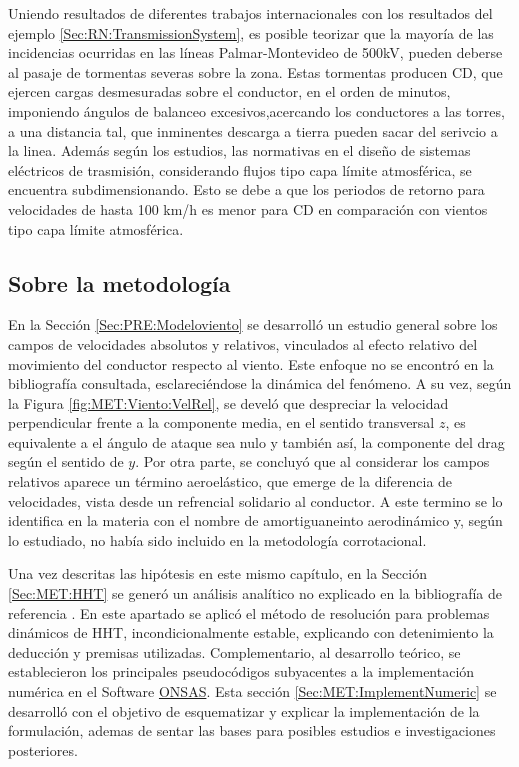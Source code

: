 Uniendo resultados de diferentes trabajos internacionales con los resultados del  ejemplo \ref{Sec:RN:TransmissionSystem}, es posible teorizar que la mayoría de las incidencias ocurridas en las líneas Palmar-Montevideo de 500kV, pueden deberse al pasaje de tormentas severas sobre la zona. Estas tormentas producen CD, que ejercen cargas desmesuradas sobre el conductor, en el orden de minutos, imponiendo ángulos de balanceo excesivos,acercando los conductores a las torres, a una distancia tal, que inminentes descarga a tierra pueden sacar del serivcio a la linea. Además según los estudios, las normativas en el diseño de sistemas eléctricos de trasmisión, considerando flujos tipo capa límite atmosférica, se encuentra subdimensionando. Esto se debe a que los periodos de retorno para velocidades de hasta 100 km/h es menor para CD en comparación con vientos tipo capa límite atmosférica. 


\subsection{Sobre la metodología}
En la Sección \ref{Sec:PRE:Modeloviento} se desarrolló un estudio general sobre los campos de velocidades absolutos y relativos, vinculados al efecto relativo del movimiento del conductor respecto al viento. Este enfoque no se encontró en la bibliografía consultada, esclareciéndose la dinámica del fenómeno. A su vez, según la Figura \ref{fig:MET:Viento:VelRel}, se develó que despreciar la velocidad perpendicular frente a la componente media, en el sentido transversal $z$,  es equivalente a el ángulo de ataque sea nulo y también así, la componente del drag según el sentido de $y$. Por otra parte, se concluyó que al considerar los campos relativos aparece un término aeroelástico, que emerge de la diferencia de velocidades, vista desde un refrencial solidario al conductor. A este termino se lo identifica en la materia con el nombre de amortiguaneinto aerodinámico y, según lo estudiado, no había sido incluido en la metodología corrotacional. 

Una vez descritas las hipótesis en este mismo capítulo, en la Sección \ref{Sec:MET:HHT} se generó un análisis analítico no explicado en la bibliografía de referencia \citep{Le2014}. En este apartado se aplicó el método de resolución para problemas dinámicos de HHT, incondicionalmente estable, explicando con detenimiento la deducción y premisas utilizadas. Complementario, al desarrollo teórico, se establecieron los principales pseudocódigos subyacentes a la implementación numérica en el Software \href{https://github.com/ONSAS/ONSAS/}{ONSAS}. Esta sección \ref{Sec:MET:ImplementNumeric} se desarrolló con el objetivo de esquematizar y explicar la implementación de la formulación, ademas de sentar las bases para posibles estudios e investigaciones posteriores. 

